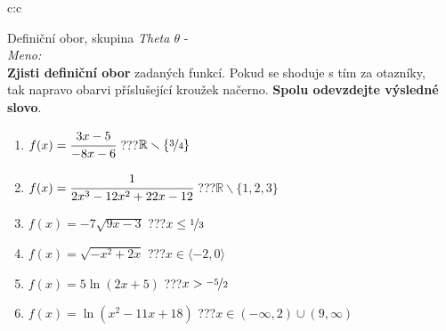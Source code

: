 \documentclass[10pt]{report}
\begin{document}
\newpage
\thispagestyle{empty}
\begin{tabular}{c:c}
\begin{minipage}[c][99mm][t]{0.49\linewidth}
\begin{center}
\vspace{7mm}
{\huge Definiční obor, skupina \textit{Theta $\theta$} -}\\[4.5mm]
\textit{Meno:}\phantom{xxxxxxxxxxxxxxxxxxxxxxxxxxxxxxxxxxxxxxxxxxxxxxxxxxxxxxxxxxxxxxxxx}\\[3.5mm]
\textbf{Zjisti definiční obor} zadaných funkcí. Pokud se shoduje s tím za otazníky,\\tak napravo obarvi příslušející kroužek načerno. \textbf{Spolu odevzdejte výsledné slovo}.\\[3mm]
\begin{minipage}{0.77\linewidth}
\begin{center}
\begin{varwidth}{\textwidth}
\begin{enumerate}
\normalsize
\item $f(x)=\cfrac{3x-5}{-8x-6}$\quad \dotfill\; ???\;\dotfill \quad $\mathbb{R}\smallsetminus\{\nicefrac{3}{4}\}$
\item $f(x)=\cfrac{1}{2x^3-12x^2+22x-12}$\quad \dotfill\; ???\;\dotfill \quad $\mathbb{R}\smallsetminus\{1,2,3\}$
\item $f(x)=-7\sqrt{9x-3}$\quad \dotfill\; ???\;\dotfill \quad $x\leq\nicefrac{1}{3}$
\item $f(x)=\sqrt{-x^2+2x}$\quad \dotfill\; ???\;\dotfill \quad $x\in\langle-2 , 0\rangle$
\item $f(x)=5\ln{(2x+5)}$\quad \dotfill\; ???\;\dotfill \quad $x>\nicefrac{-5}{2}$
\item $f(x)=\ln{(x^2-11x+18)}$\quad \dotfill\; ???\;\dotfill \quad $x\in(-\infty , 2)\cup(9 , \infty)$
\end{enumerate}
\end{varwidth}
\end{center}
\end{minipage}

\end{center}
\end{minipage}
\end{tabular}
\end{document}
